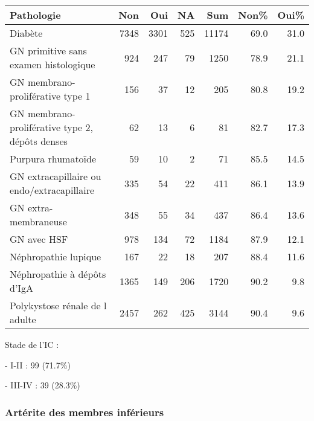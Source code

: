 \documentclass[11pt,a4paper]{article}\usepackage[]{graphicx}\usepackage[]{color}
\begin{document}
\begin{table}[H]
\centering
\begin{tabular}{lrrrrrr}
  \hline
Pathologie & Non & Oui & NA & Sum & Non\% & Oui\% \\ 
  \hline
Diabète & 7348 & 3301 & 525 & 11174 & 69.0 & 31.0 \\ 
  GN primitive sans examen histologique & 924 & 247 & 79 & 1250 & 78.9 & 21.1 \\ 
  GN membrano-proliférative type 1 & 156 & 37 & 12 & 205 & 80.8 & 19.2 \\ 
  GN membrano-proliférative type 2, dépôts denses & 62 & 13 &  6 & 81 & 82.7 & 17.3 \\ 
  Purpura rhumatoïde & 59 & 10 &  2 & 71 & 85.5 & 14.5 \\ 
  GN extracapillaire ou endo/extracapillaire & 335 & 54 & 22 & 411 & 86.1 & 13.9 \\ 
  GN extra-membraneuse & 348 & 55 & 34 & 437 & 86.4 & 13.6 \\ 
  GN avec HSF & 978 & 134 & 72 & 1184 & 87.9 & 12.1 \\ 
  Néphropathie lupique & 167 & 22 & 18 & 207 & 88.4 & 11.6 \\ 
  Néphropathie à dépôts d'IgA & 1365 & 149 & 206 & 1720 & 90.2 & 9.8 \\ 
  Polykystose rénale de l adulte & 2457 & 262 & 425 & 3144 & 90.4 & 9.6 \\ 
   \hline
\end{tabular}
\end{table}


Stade de l’IC :

- I-II : 99 (71.7\%)

- III-IV : 39 (28.3\%)

\subsubsection*{Artérite des membres inférieurs}
\end{document}
